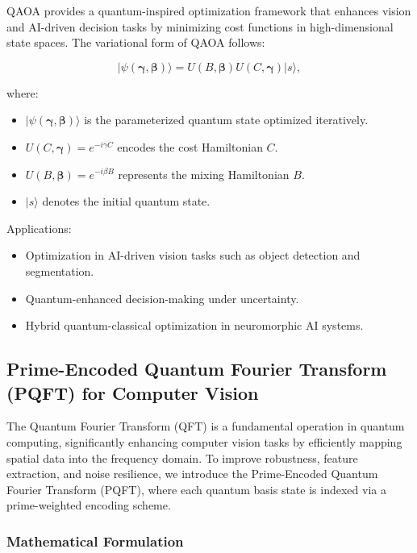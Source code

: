 \documentclass{article}
\theoremstyle{plain}
\begin{document}
\begin{itemize}
\begin{itemize}
QAOA provides a quantum-inspired optimization framework that enhances vision and AI-driven decision tasks by minimizing cost functions in high-dimensional state spaces. The variational form of QAOA follows:

\begin{equation}
|\psi(\boldsymbol{\gamma}, \boldsymbol{\beta})\rangle = U(B, \boldsymbol{\beta}) U(C, \boldsymbol{\gamma}) |s\rangle,
\end{equation}

where:
\begin{itemize}
    \item $|\psi(\boldsymbol{\gamma}, \boldsymbol{\beta})\rangle$ is the parameterized quantum state optimized iteratively.
    \item $U(C, \boldsymbol{\gamma}) = e^{-i \gamma C}$ encodes the cost Hamiltonian $C$.
    \item $U(B, \boldsymbol{\beta}) = e^{-i \beta B}$ represents the mixing Hamiltonian $B$.
    \item $|s\rangle$ denotes the initial quantum state.
\end{itemize}

Applications:
\begin{itemize}
    \item Optimization in AI-driven vision tasks such as object detection and segmentation.
    \item Quantum-enhanced decision-making under uncertainty.
    \item Hybrid quantum-classical optimization in neuromorphic AI systems.
\end{itemize}

\subsection{Prime-Encoded Quantum Fourier Transform (PQFT) for Computer Vision}

The Quantum Fourier Transform (QFT) is a fundamental operation in quantum computing, significantly enhancing computer vision tasks by efficiently mapping spatial data into the frequency domain. To improve robustness, feature extraction, and noise resilience, we introduce the Prime-Encoded Quantum Fourier Transform (PQFT), where each quantum basis state is indexed via a prime-weighted encoding scheme.

\subsubsection{Mathematical Formulation}


\end{itemize}
\end{itemize}
\end{document}
